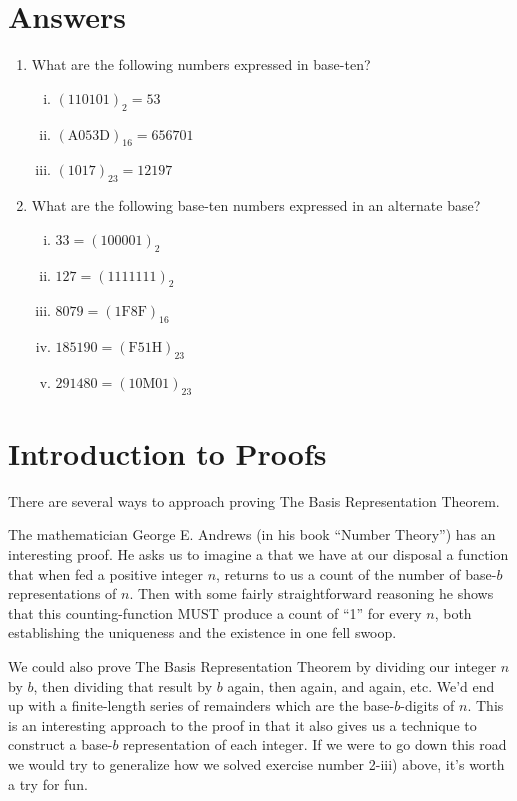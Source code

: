 \documentclass{article}
\begin{document}
\section*{Answers}
\begin{enumerate}
\item What are the following numbers expressed in base-ten?
\begin{enumerate}[i)]
\item $(110101)_2 = 53$
\item $(\text{A}053\text{D})_{16}=656701$
\item $(1017)_{23} = 12197$
\end{enumerate}
\item What are the following base-ten numbers expressed in an alternate base?
\begin{enumerate}[i)]
\item $33 = (100001)_2$
\item $127 = (1111111)_2$
\item $8079 = (1\text{F}8\text{F})_{16}$
\item $185190 = (\text{F}51\text{H})_{23}$
\item $291480 = (10\text{M}01)_{23}$
\end{enumerate}
\end{enumerate}

\break
\section*{Introduction to Proofs}

There are several ways to approach
proving The Basis Representation Theorem.

The mathematician George E. Andrews (in his book
``Number Theory'') has an interesting proof.
He asks us to imagine a that we have at our disposal a function that when fed a positive integer $n$,
returns to us a count of the number of base-$b$ representations of $n$.
Then with some fairly straightforward reasoning he shows that this counting-function
MUST produce a count of ``1'' for every $n$, both establishing the uniqueness 
and the existence in one fell swoop.

We could also prove The Basis Representation Theorem by dividing our integer $n$ by $b$, then dividing that
result by $b$ again, then again, and again, etc. We'd end up with a finite-length series
of remainders which are the base-$b$-digits of $n$.
This is an interesting approach to the proof in that it also gives us a technique
to construct a base-$b$ representation of each integer.
If we were to go down this road
we would try to generalize how we solved
exercise number 2-iii) above, it's worth a try for fun.
\end{document}
